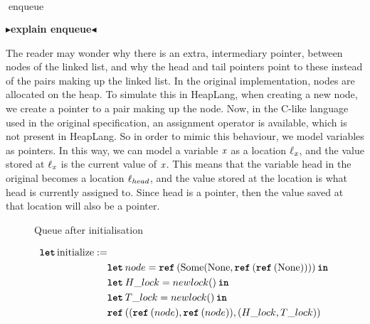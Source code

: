 \documentclass[twoside,11pt,openright]{report}
\newcommand{\initialise}{\operatorname{initialize}}
\newcommand{\enqueue}{\operatorname{enqueue}}
\newcommand{\todo}[1]{{\color[rgb]{.5,0,0}\textbf{$\blacktriangleright$#1$\blacktriangleleft$}}}
\begin{document}
$\enqueue$

\todo{explain enqueue}

The reader may wonder why there is an extra, intermediary pointer, between nodes of the linked list, and why the head and tail pointers point to these instead of the pairs making up the linked list. In the original implementation, nodes are allocated on the heap. To simulate this in HeapLang, when creating a new node, we create a pointer to a pair making up the node. Now, in the C-like language used in the original specification, an assignment operator is available, which is not present in HeapLang. So in order to mimic this behaviour, we model variables as pointers. In this way, we can model a variable $\mathit{x}$ as a location $\ell_{\mathit{x}}$, and the value stored at $\ell_{\mathit{x}}$ is the current value of $\mathit{x}$. This means that the variable head in the original becomes a location $\ell_{head}$, and the value stored at the location is what head is currently assigned to. Since head is a pointer, then the value saved at that location will also be a pointer.



\begin{figure}[h]
  \centering
  \caption{Queue after initialisation}
  \label{MSQTL:impl:figure:init}
\end{figure}

\begin{align*}
  \langkw{let} \initialise := &\\
                    & \Let node = \Ref(\Some (\None, \Ref(\Ref(\None)))) in\\
                    & \Let H\_lock = newlock \TT in\\
                    & \Let T\_lock = newlock \TT in\\
                    & \Ref ((\Ref(node), \Ref(node)), (H\_lock, T\_lock))
\end{align*}
\end{document}
